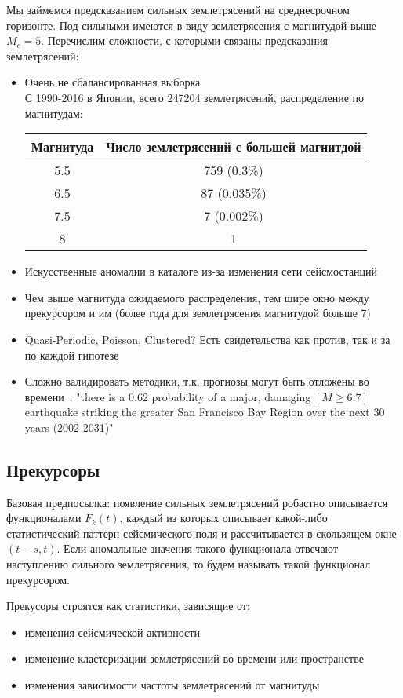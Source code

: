 Мы займемся предсказанием сильных землетрясений на среднесрочном горизонте. Под сильными имеются в виду землетрясения с магнитудой выше $M_c = 5$.
Перечислим сложности, с которыми связаны предсказания землетрясений:
\begin{itemize}
\item Очень не сбалансированная выборка \\

С 1990-2016 в Японии, всего 247204 землетрясений, распределение по магнитудам:
\begin{table}[H]
\centering
\begin{tabular}{cc}
\hline
\multicolumn{1}{|c|}{\textbf{Магнитуда}} & \multicolumn{1}{c|}{\textbf{Число землетрясений с большей магнитдой}} \\ \hline
5.5 & 759 (0.3\%) \\
6.5 & 87 (0.035\%) \\
7.5 & 7 (0.002\%) \\
8 & 1
\end{tabular}
\end{table}

\item Искусственные аномалии в каталоге из-за изменения сети сейсмостанций
\item Чем выше магнитуда ожидаемого распределения, тем шире окно между прекурсором и им (более года для землетрясения магнитудой больше 7)
\item Quasi-Periodic, Poisson, Clustered? Есть свидетельства как против, так и за по каждой гипотезе
\item Сложно валидировать методики, т.к. прогнозы могут быть отложены во времени~\cite{work}: "there is a 0.62 probability of a major, damaging $[M \geq 6.7]$ earthquake striking the greater San Francisco Bay Region over the next 30 years (2002-2031)"
\end{itemize}

\subsection{Прекурсоры}
Базовая предпосылка: появление сильных землетрясений робастно описывается функционалами  $F_k(t)$, каждый из которых описывает какой-либо статистический паттерн сейсмического поля и рассчитывается в скользящем окне $(t - s, t)$. Если аномальные значения такого функционала отвечают наступлению сильного землетрясения, то будем называть такой функционал прекурсором.

Прекусоры строятся как статистики, зависящие от:
\begin{itemize}
\item изменения сейсмической активности
\item изменение кластеризации землетрясений во времени или пространстве 
\item изменения зависимости частоты землетрясений от магнитуды
\end{itemize}

